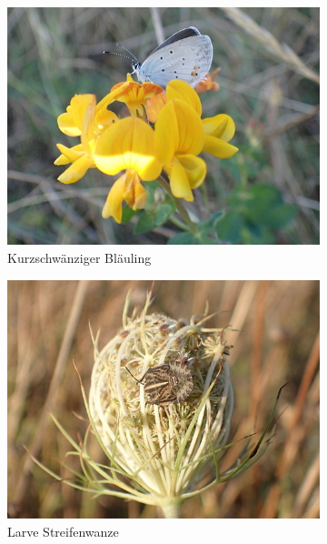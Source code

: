\documentclass[10pt]{article}
\begin{document}
\begin{figure}[h!]
  \centering
  \begin{subfigure}[b]{0.44\linewidth}
    \includegraphics[width=\linewidth]{img/randkanal/blauling.jpg}
    \caption{Kurzschwänziger Bläuling}
  \end{subfigure}
  \begin{subfigure}[b]{0.44\linewidth}
    \includegraphics[width=\linewidth]{img/randkanal/streifenwanze.jpg}
    \caption{Larve Streifenwanze}
  \end{subfigure}
  \begin{subfigure}[b]{0.45\linewidth}

\end{subfigure}
\end{figure}
\end{document}
